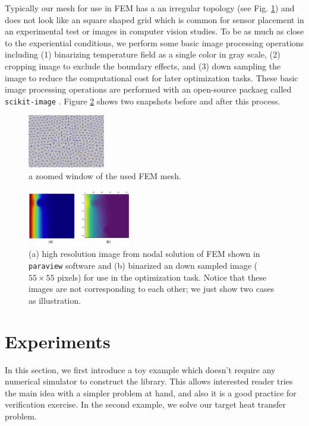 \documentclass[conference]{IEEEtran}
\begin{document}
Typically our mesh for use in FEM has a an irregular topology (see Fig. \ref{fig::mesh}) and does not look like an square shaped grid which is common for sensor placement in an experimental test or images in computer vision studies. To be as much as close to the experiential conditions, we perform some basic image processing operations including (1) binarizing temperature field as a single color in gray scale, (2) cropping image to exclude the boundary effects, and (3) down sampling the image to reduce the computational cost for later optimization tasks. These basic image processing operations are performed with an open-source packaeg called \texttt{scikit-image} \cite{Walt2014}. Figure \ref{fig::img-proc} shows two snapshots before and after this process.

\begin{figure}[!ht]
  \centering
  \includegraphics[width=0.3\textwidth]{figure/mesh.png}
  \caption{a zoomed window of the used FEM mesh.}\label{fig::mesh}
\end{figure}

\begin{figure}[!ht]
  \centering
  \includegraphics[width=0.4\textwidth]{figure/image_proc.png}
  \caption{(a) high resolution image from nodal solution of FEM shown in \texttt{paraview} software \cite{Ahrens2005} and (b) binarized an down sampled image ($55\times55$ pixels) for use in the optimization task. Notice that these images are not corresponding to each other; we just show two cases as illustration.}\label{fig::img-proc}
\end{figure}

\section{Experiments}
In this section, we first introduce a toy example which doesn't require any numerical simulator to construct the library. This allows interested reader tries the main idea with a simpler problem at hand, and also it is a good practice for verification exercise. In the second example, we solve our target heat transfer problem.
\end{document}
